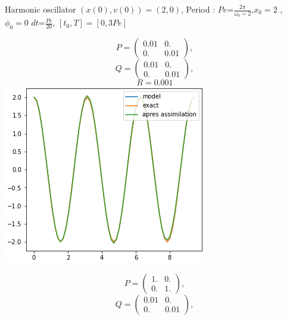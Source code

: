    \begin{frame}{Harmonic oscillator}
       \small
       $(x(0),v(0))=(2,0)$, \quad Period : \; $Pe$=$\frac{2\pi}{\omega_0=2}$,\quad $x_0=2$ \quad, $\phi_0=0$ \quad $dt$=$\frac{Pe}{20}$, \quad $[t_0,T]=[0,3Pe]$
       \begin{minipage}{.32\linewidth}
           \centering
           $$P=\begin{pmatrix}
               0.01 & 0. \\ 
               0. & 0.01 
           \end{pmatrix} ,$$
           $$Q=\begin{pmatrix}
               0.01 & 0. \\
               0. & 0.01 
           \end{pmatrix} ,$$
           $$R=0.001$$
           \includegraphics[width=\linewidth]{"images/enkf/oscillator1_b.png"}
       \end{minipage} \;
       \begin{minipage}{.32\linewidth}
           \centering
           $$P=\begin{pmatrix}
               1. & 0. \\
               0. & 1. 
           \end{pmatrix} ,$$
           $$Q=\begin{pmatrix}
               0.01 & 0. \\
               0. & 0.01 
           \end{pmatrix} ,$$

\end{minipage}
\end{frame}
